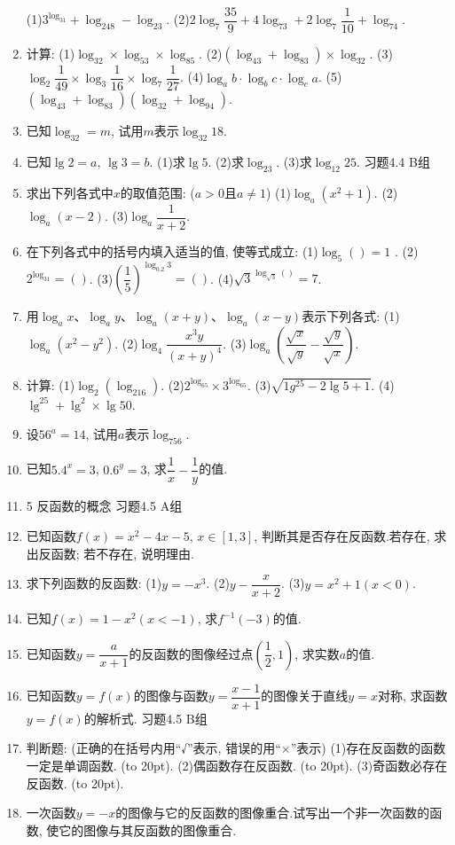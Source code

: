 \documentclass[10pt,a4paper]{article}
\newcommand{\bracket}[1]{(\hbox to #1pt{})}
\begin{document}
\begin{enumerate}[1.]
(1)$3^{\log _31}+\log _248-\log _23$.
(2)$2\log _7\dfrac{35}9+4\log _73+2\log _7\dfrac 1{10}+\log _74$.
\item 计算:
(1)$\log _32\times \log _53\times \log _85$.			(2)$(\log _43+\log _83)\times \log _32$.
(3)$\log _2\dfrac 1{49}\times \log _3\dfrac 1{16}\times \log _7\dfrac 1{27}$.		(4)$\log _ab\cdot \log _bc\cdot \log _ca$.
(5)$(\log _43+\log _83)(\log _32+\log _94)$.
\item 已知$\log _32=m$, 试用$m$表示$\log _{32}18$.
\item 已知$\lg 2=a$, $\lg 3=b$.
(1)求$\lg 5$.
(2)求$\log _23$.
(3)求$\log _{12}25$.
习题4.4  B组
\item 求出下列各式中$x$的取值范围: ($a>0$且$a\ne 1$)
(1)$\log _a(x^2+1)$.					(2)$\log _a(x-2)$.
(3)$\log _a\dfrac 1{x+2}$.
\item 在下列各式中的括号内填入适当的值, 使等式成立:
(1)$\log _5()=1$	.					(2)$2^{\log _31}=()$.
(3)$(\dfrac 15)^{\log _{0.2}3}=()$.					(4)$\sqrt 3^{\log _{\sqrt 3}()}=7$.
\item 用$\log _ax$、$\log _ay$、$\log _a(x+y)$、$\log _a(x-y)$表示下列各式:
(1)$\log _a(x^2-y^2)$.					(2)$\log _4\dfrac{{x^3}y}{{{(x+y)}^4}}$.
(3)$\log _a(\dfrac{\sqrt x}{\sqrt y}-\dfrac{\sqrt y}{\sqrt x})$.
\item 计算:
(1)$\log _2(\log _216)$.					(2)$2^{\log _65}\times 3^{\log _65}$.
(3)$\sqrt {1g^25-2\lg 5+1}$.				(4)$\lg ^25+\lg ^2\times \lg 50$.
\item 设$56^a=14$, 试用$a$表示$\log _756$.
\item 已知$5.4^x=3$, $0.6^y=3$, 求$\dfrac 1x-\dfrac 1y$的值.
\item 5  反函数的概念
习题4.5  A组
\item 已知函数$f(x)=x^2-4x-5$, $x\in [1,3]$, 判断其是否存在反函数.若存在, 求出反函数; 若不存在, 说明理由.
\item 求下列函数的反函数:
(1)$y=-x^3$.						(2)$y-\dfrac x{x+2}$.
(3)$y=x^2+1(x<0)$.
\item 已知$f(x)=1-x^2(x<-1)$, 求$f^{-1}(-3)$的值.
\item 已知函数$y=\dfrac a{x+1}$的反函数的图像经过点$(\dfrac 12,1)$, 求实数$a$的值.
\item 已知函数$y=f(x)$的图像与函数$y=\dfrac{x-1}{x+1}$的图像关于直线$y=x$对称, 求函数$y=f(x)$的解析式.
习题4.5  B组
\item 判断题: (正确的在括号内用``√''表示, 错误的用``×''表示)
(1)存在反函数的函数一定是单调函数.				\bracket{20}.
(2)偶函数存在反函数.							\bracket{20}.
(3)奇函数必存在反函数.							\bracket{20}.
\item 一次函数$y=-x$的图像与它的反函数的图像重合.试写出一个非一次函数的函数, 使它的图像与其反函数的图像重合.

\end{enumerate}
\end{document}

